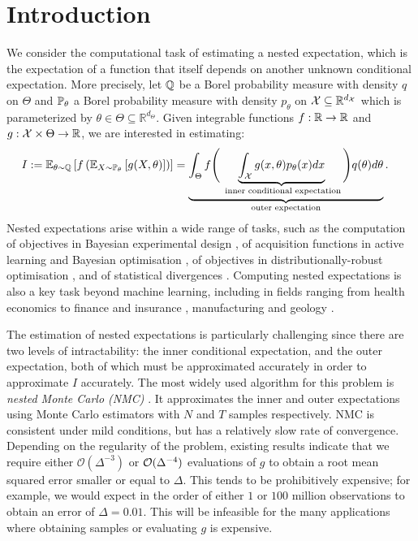 \section{Introduction}
We consider the computational task of estimating a nested expectation, which is the expectation of a function that itself depends on another unknown conditional expectation. More precisely, let $\mathbb{Q}$ be a Borel probability measure with density $q$ on $\Theta$ and $\mathbb{P}_\theta$ a Borel probability measure with density $p_\theta$ on $\mathcal{X} \subseteq \mathbb{R}^{d_{\mathcal{X}}}$ which is parameterized by $\theta \in \Theta \subseteq \mathbb{R}^{d_{\Theta}}$.  Given integrable functions $f: \mathbb{R} \to \mathbb{R}$ and $g:\mathcal{X} \times \Theta \to \mathbb{R}$, we are interested in estimating:
\begin{align}\label{eq:nested}
    I & := \operatorname{\mathbb{E}}_{\theta \sim \mathbb{Q}} \left[ f \left(\operatorname{\mathbb{E}}_{X \sim \mathbb{P}_\theta} \left[ g(X, \theta) \right] \right) \right] = \underbrace{\int_{\Theta} f\Bigg(\underbrace{\int_{\mathcal{X}} g(x,\theta) p_{\theta}(x) dx}_{\text{ inner conditional expectation}} \Bigg) q(\theta) d\theta}_{\text{outer expectation}}. 
\end{align}
Nested expectations arise within a wide range of tasks, such as the computation of objectives in Bayesian experimental design \citep{Beck2020,Goda2020,Rainforth2024}, of acquisition functions in active learning and Bayesian optimisation \citep{Ginsbourger2010,Yang2024}, of objectives in distributionally-robust optimisation \citep{Shapiro2023,Bariletto2024,Dellaporta2024}, and of statistical divergences \citep{Song2020,Kanagawa2019}.
Computing nested expectations is also a key task beyond machine learning, including in fields ranging from health economics \citep{giles2019decision} to finance and insurance \citep{Gordy2010,Giles2019}, manufacturing \citep{Andradottir2016} 
and geology \citep{Goda2018}.

The estimation of nested expectations is particularly challenging since there are two levels of intractability: the inner conditional expectation, and the outer expectation, both of which must be approximated accurately in order to approximate $I$ accurately. The most widely used algorithm for this problem is \emph{nested Monte Carlo (NMC)} \citep{Lee2003,Hong2009,rainforth2018nesting}. It approximates the inner and outer expectations using Monte Carlo estimators with $N$ and $T$ samples respectively. NMC is consistent under mild conditions, but has a relatively slow rate of convergence. Depending on the regularity of the problem, existing results indicate that we require either $\mathcal{O}(\Delta^{-3})$ or $\mathcal{O}(\Delta^{-4})$ evaluations of $g$ to obtain a root mean squared error smaller or equal to $\Delta$. 
This tends to be prohibitively expensive; for example, we would expect in the order of either $1$ or $100$ million observations to obtain an error of $\Delta=0.01$. This will be infeasible for the many applications where obtaining samples or evaluating $g$ is expensive.


